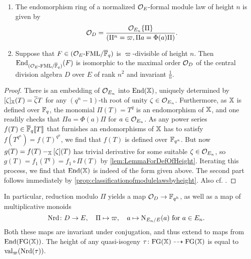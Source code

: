 \documentclass[../main.tex]{subfiles}
\begin{document}
\begin{prop}\label{prop:EndomorphismsOfFormalModulesOverksep}
  \begin{enumerate}
    \item The endomorphism ring of a normalized $\mathcal{O}_E$-formal module law of 
      height $n$ is given by 
      \begin{equation}\label{eq:DescripitionOfEnds}
        \mathcal{O}_D = \frac{\mathcal{O}_{E_n}\{\Pi\}}{(\Pi^n = \varpi, \Pi a = \Phi(a) \Pi)}.
      \end{equation}
    \item Suppose that $F \in {({\mathcal{O}_E}\textnormal-\allowbreak\mathrm{FML}/{{\overline{\mathbb{F}}_q}})}$ is $\varpi$-divisible
      of height $n$. Then 
      $\operatorname{End}_{{({\mathcal{O}_E}\textnormal-\allowbreak\mathrm{FML}/{{\overline {\mathbb{F}}_q}})}}(F)$ is isomorphic to the maximal order $\mathcal{O}_D$
      of the central division algebra $D$ over $E$ of rank $n^2$ and invariant
      $\frac 1n$.
  \end{enumerate}
  \begin{proof}
  There is an embedding of $\mathcal{O}_{E_n}$ into $\operatorname{End}(\mathbb{X})$, uniquely determined by
  $[\zeta]_{\mathbb{X}}(T) = \overline \zeta T$ for any $(q^n-1)$-th root of unity $\zeta \in
  \mathcal{O}_{E_n}$.
  Furthermore, as $\mathbb{X}$ is defined over $\mathbb{F}_q$, the monomial
  $\Pi(T) = T^q$ is an endomorphism of $\mathbb{X}$, and one readily checks that
  $\Pi a = \Phi(a) \Pi$ for $a \in \mathcal{O}_{E_n}$. As any power series $f(T) \in
  {\overline{\mathbb{F}}_q} \llbracket T \rrbracket$
  that furnishes an endomorphisms of $\mathbb{X}$ has to satisfy $f(T^{q^n}) = f(T)^{q^n}$,
  we find that $f(T)$ is defined over $\mathbb{F}_{q^n}$. But now 
  $g(T) = f(T) -_{\mathbb{X}} [\zeta](T)$ has trivial derivative for some suitable
  $\zeta \in \mathcal{O}_{E_n}$, so $g(T) = f_1(T^q) = f_1 \circ \Pi(T)$ by
  \cref{lem:LemmaForDefOfHeight}.
  Iterating this process, we find that $\operatorname{End}(\mathbb{X})$ is indeed of the form
  given above. The second part follows immediately by
  \cref{prop:classificationofmodulelawsbyheight}. Also cf.
  \cite[Proposition 1.7]{drinfel1974elliptic}.
\end{proof}
\end{prop}

In particular, reduction modulo $\Pi$ yields a map $\mathcal{O}_D \to \mathbb{F}_{q^h}$, as
well as a map of multiplicative monoids
$$\operatorname{Nrd}\colon D \to E, \quad \Pi \mapsto \varpi, \quad a \mapsto
\operatorname{N}_{E_n/E}(a) \text{ for } a \in E_n.$$
Both these maps are invariant under conjugation, and thus extend to maps
from $\operatorname{End}(\textnormal{FG}(\mathbb{X}))$. The height of any quasi-isogeny
$\tau\colon \textnormal{FG}(\mathbb{X}) \dashrightarrow \textnormal{FG}(\mathbb{X})$ is equal to $\mathrm{val}_\varpi(\operatorname{Nrd}(\tau))$.
\end{document}
